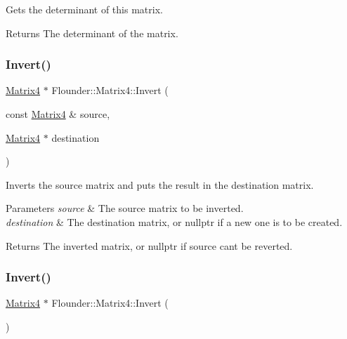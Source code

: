 Gets the determinant of this matrix. 

\begin{DoxyReturn}{Returns}
The determinant of the matrix. 
\end{DoxyReturn}
\mbox{\label{class_flounder_1_1_matrix4_ae48cb847531544dbbdcff48f8a244c66}} 
\subsubsection{\texorpdfstring{Invert()}{Invert()}\hspace{0.1cm}{\footnotesize\ttfamily [1/2]}}
{\footnotesize\ttfamily \hyperlink{class_flounder_1_1_matrix4}{Matrix4} $\ast$ Flounder\+::\+Matrix4\+::\+Invert (\begin{DoxyParamCaption}\item[{const \hyperlink{class_flounder_1_1_matrix4}{Matrix4} \&}]{source,  }\item[{\hyperlink{class_flounder_1_1_matrix4}{Matrix4} $\ast$}]{destination }\end{DoxyParamCaption})\hspace{0.3cm}{\ttfamily [static]}}



Inverts the source matrix and puts the result in the destination matrix. 


\begin{DoxyParams}{Parameters}
{\em source} & The source matrix to be inverted. \\
\hline
{\em destination} & The destination matrix, or nullptr if a new one is to be created. \\
\hline
\end{DoxyParams}
\begin{DoxyReturn}{Returns}
The inverted matrix, or nullptr if source can\textquotesingle{}t be reverted. 
\end{DoxyReturn}
\mbox{\label{class_flounder_1_1_matrix4_a1661b4414ca902c626bd9e7dc0c08a92}} 
\subsubsection{\texorpdfstring{Invert()}{Invert()}\hspace{0.1cm}{\footnotesize\ttfamily [2/2]}}
{\footnotesize\ttfamily \hyperlink{class_flounder_1_1_matrix4}{Matrix4} $\ast$ Flounder\+::\+Matrix4\+::\+Invert (\begin{DoxyParamCaption}{ }\end{DoxyParamCaption})}



